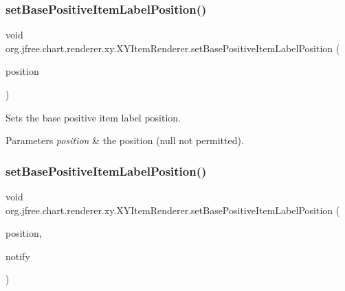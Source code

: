 \subsubsection{\texorpdfstring{set\+Base\+Positive\+Item\+Label\+Position()}{setBasePositiveItemLabelPosition()}\hspace{0.1cm}{\footnotesize\ttfamily [1/2]}}
{\footnotesize\ttfamily void org.\+jfree.\+chart.\+renderer.\+xy.\+X\+Y\+Item\+Renderer.\+set\+Base\+Positive\+Item\+Label\+Position (\begin{DoxyParamCaption}\item[{\mbox{\hyperlink{classorg_1_1jfree_1_1chart_1_1labels_1_1_item_label_position}{Item\+Label\+Position}}}]{position }\end{DoxyParamCaption})}

Sets the base positive item label position.


\begin{DoxyParams}{Parameters}
{\em position} & the position ({\ttfamily null} not permitted). \\
\hline
\end{DoxyParams}
\mbox{\label{interfaceorg_1_1jfree_1_1chart_1_1renderer_1_1xy_1_1_x_y_item_renderer_a10f957f608d9c7f57e2405c09dc2072f}} 
\subsubsection{\texorpdfstring{set\+Base\+Positive\+Item\+Label\+Position()}{setBasePositiveItemLabelPosition()}\hspace{0.1cm}{\footnotesize\ttfamily [2/2]}}
{\footnotesize\ttfamily void org.\+jfree.\+chart.\+renderer.\+xy.\+X\+Y\+Item\+Renderer.\+set\+Base\+Positive\+Item\+Label\+Position (\begin{DoxyParamCaption}\item[{\mbox{\hyperlink{classorg_1_1jfree_1_1chart_1_1labels_1_1_item_label_position}{Item\+Label\+Position}}}]{position,  }\item[{boolean}]{notify }\end{DoxyParamCaption})}

